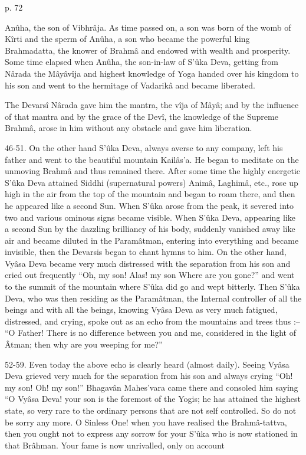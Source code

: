  

p. 72

 

Anûha, the son of Vibhrâja. As time passed on, a son was born of the womb of Kîrti and the sperm of Anûha, a son who became the powerful king Brahmadatta, the knower of Brahmâ and endowed with wealth and prosperity. Some time elapsed when Anûha, the son-in-law of S’ûka Deva, getting from Nârada the Mâyâvîja and highest knowledge of Yoga handed over his kingdom to his son and went to the hermitage of Vadarikâ and became liberated.

 

The Devarsî Nârada gave him the mantra, the vîja of Mâyâ; and by the influence of that mantra and by the grace of the Devî, the knowledge of the Supreme Brahmâ, arose in him without any obstacle and gave him liberation.

 

46-51. On the other hand S’ûka Deva, always averse to any company, left his father and went to the beautiful mountain Kailâs'a. He began to meditate on the unmoving Brahmâ and thus remained there. After some time the highly energetic S’ûka Deva attained Siddhi (supernatural powers) Animâ, Laghimâ, etc., rose up high in the air from the top of the mountain and began to roam there, and then he appeared like a second Sun. When S’ûka arose from the peak, it severed into two and various ominous signs became visible. When S’ûka Deva, appearing like a second Sun by the dazzling brilliancy of his body, suddenly vanished away like air and became diluted in the Paramâtman, entering into everything and became invisible, then the Devarsis began to chant hymns to him. On the other hand, Vyâsa Deva became very much distressed with the separation from his son and cried out frequently “Oh, my son! Alas! my son Where are you gone?” and went to the summit of the mountain where S’ûka did go and wept bitterly. Then S’ûka Deva, who was then residing as the Paramâtman, the Internal controller of all the beings and with all the beings, knowing Vyâsa Deva as very much fatigued, distressed, and crying, spoke out as an echo from the mountains and trees thus :-- “O Father! There is no difference between you and me, considered in the light of Âtman; then why are you weeping for me?”

 

52-59. Even today the above echo is clearly heard (almost daily). Seeing Vyâsa Deva grieved very much for the separation from his son and always crying “Oh! my son! Oh! my son!” Bhagavân Mahes'vara came there and consoled him saying “O Vyâsa Deva! your son is the foremost of the Yogis; he has attained the highest state, so very rare to the ordinary persons that are not self controlled. So do not be sorry any more. O Sinless One! when you have realised the Brahmâ-tattva, then you ought not to express any sorrow for your S’ûka who is now stationed in that Brâhman. Your fame is now unrivalled, only on account

